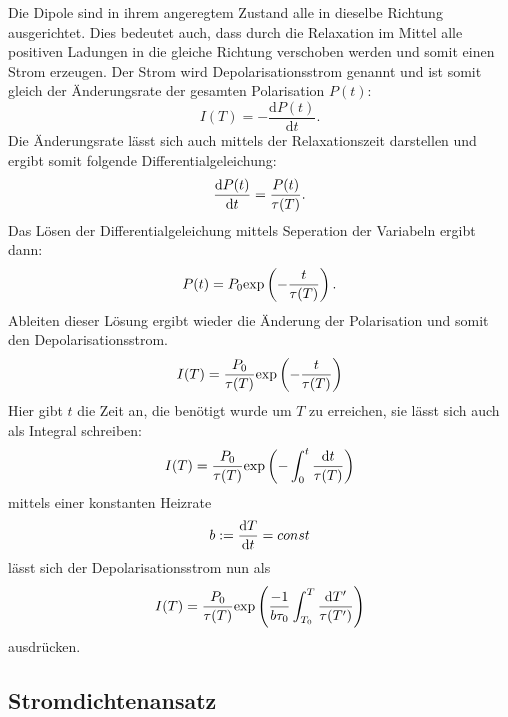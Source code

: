 		Die Dipole sind in ihrem angeregtem Zustand alle in dieselbe Richtung ausgerichtet.
		Dies bedeutet auch, dass durch die Relaxation im Mittel alle positiven Ladungen in 
		die gleiche Richtung verschoben werden und somit einen Strom erzeugen.
		Der Strom wird Depolarisationsstrom genannt und ist somit gleich der Änderungsrate der 
		gesamten Polarisation $P(t)$:
		\begin{equation}
			I(T) = - \frac{\text{d}P(t)}{\text{d}t}.
		\end{equation}
		Die Änderungsrate lässt sich auch mittels der Relaxationszeit darstellen und ergibt somit 
		folgende Differentialgeleichung:
		\begin{equation}
			\frac{\text{d} P(t)}{\text{d} t} = \frac{P(t)}{\tau(T)}.
			\label{eqn:diff}
		\end{equation}
		Das Lösen der Differentialgeleichung mittels Seperation der Variabeln ergibt dann:
		\begin{equation}
			P(t) = P_0 \text{exp}\left(- \frac{t}{\tau(T)} \right).
		\end{equation}
		Ableiten dieser Lösung ergibt wieder die Änderung der Polarisation und somit den 
		Depolarisationsstrom.
		\begin{equation}
			I(T) = \frac{P_0}{\tau(T)} \text{exp}\left(-\frac{t}{\tau(T)}\right)
		\end{equation}
		Hier gibt $t$ die Zeit an, die benötigt wurde um $T$ zu erreichen, 
		sie lässt sich auch als Integral schreiben:
		\begin{equation}
			I(T) = \frac{P_0}{\tau(T)} \text{exp}\left(-\int_0^t\frac{\text{d}t}{\tau(T)}\right)
			\end{equation}
		mittels einer konstanten Heizrate
		\begin{equation}
			b := \frac{\text{d} T}{\text{d} t} = const
		\end{equation}
		lässt sich der Depolarisationsstrom nun als 
		\begin{equation}
			I(T) = \frac{P_0}{\tau(T)} \text{exp}\left(\frac{-1}{b\tau_0}\int_{T_0}^T\frac{\text{d}T'}{\tau(T')}\right)
		\end{equation}
		ausdrücken.

	\subsection{Stromdichtenansatz}
		

